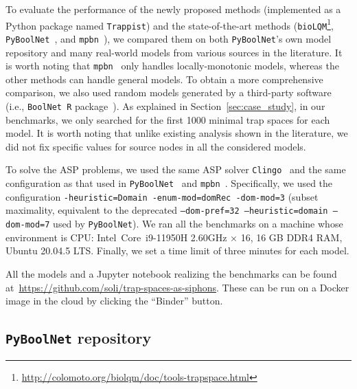 \documentclass[preprint,12pt]{elsarticle}
\begin{document}
To evaluate the performance of the newly proposed methods (implemented as a Python package named \texttt{Trappist}) and the state-of-the-art methods (\texttt{bioLQM}\footnote{\url{http://colomoto.org/biolqm/doc/tools-trapspace.html}}, \texttt{PyBoolNet}~\cite{klarner2015computing,klarner2017pyboolnet}, and \texttt{mpbn}~\cite{Paulev2020}), we compared them on both \texttt{PyBoolNet}'s own model repository and many real-world models from various sources in the literature.
It is worth noting that \texttt{mpbn}~\cite{Paulev2020} only handles locally-monotonic models, whereas the other methods can handle general models.
To obtain a more comprehensive comparison, we also used random models generated by a third-party software (i.e., \texttt{BoolNet R} package~\cite{mussel2010boolnet}).
As explained in Section~\ref{sec:case_study}, in our benchmarks, we only searched for the first 1000 minimal trap spaces for each model.
It is worth noting that unlike existing analysis shown in the literature, we did not fix specific values for source nodes in all the considered models.

To solve the ASP problems, we used the same ASP solver \texttt{Clingo}~\cite{DBLP:journals/aicom/GebserKKOSS11} and the same configuration as that used in \texttt{PyBoolNet}~\cite{klarner2015computing,klarner2017pyboolnet} and \texttt{mpbn}~\cite{Paulev2020}.
Specifically, we used the configuration \texttt{-heuristic=Domain -enum-mod=domRec -dom-mod=3} (subset maximality, equivalent to the deprecated \texttt{--dom-pref=32 --heuristic=domain --dom-mod=7} used by \texttt{PyBoolNet}). 
We ran all the benchmarks on a machine whose environment is CPU: \@ Intel\textregistered\ Core\texttrademark\ i9-11950H 2.60GHz × 16, 16 GB DDR4 RAM, Ubuntu 20.04.5 LTS. 
Finally, we set a time limit of three minutes for each model.

All the models and a Jupyter notebook realizing the benchmarks can be found at~\url{https://github.com/soli/trap-spaces-as-siphons}.
These can be run on a Docker image in the cloud by clicking the ``Binder'' button.

\subsection{\texttt{PyBoolNet} repository}
\end{document}
